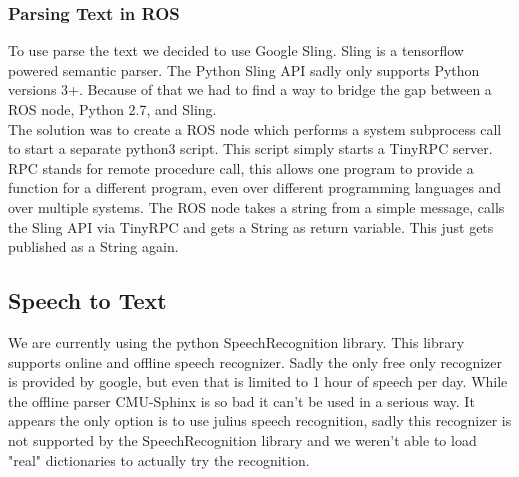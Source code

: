 \documentclass[main.tex]{subfiles}
\begin{document}
		\subsubsection{Parsing Text in ROS}
		To use parse the text we decided to use Google Sling. Sling is a tensorflow powered semantic parser. The Python Sling API sadly only supports Python versions 3+. Because of that we had to find a way to bridge the gap between a ROS node, Python 2.7, and Sling.\\
		The solution was to create a ROS node which performs a system subprocess call to start a separate python3 script. This script simply starts a TinyRPC server. RPC stands for remote procedure call, this allows one program to provide a function for a different program, even over different programming languages and over multiple systems. The ROS node takes a string from a simple message, calls the Sling API via TinyRPC and gets a String as return variable. This just gets published as a String again.
		
		\subsection{Speech to Text}
		We are currently using the python SpeechRecognition library. This library supports online and offline speech recognizer. Sadly the only free only recognizer is provided by google, but even that is limited to 1 hour of speech per day. While the offline parser CMU-Sphinx is so bad it can't be used in a serious way.
		It appears the only option is to use julius speech recognition, sadly this recognizer is not supported by the SpeechRecognition library and we weren't able to load "real" dictionaries to actually try the recognition.
\end{document}

